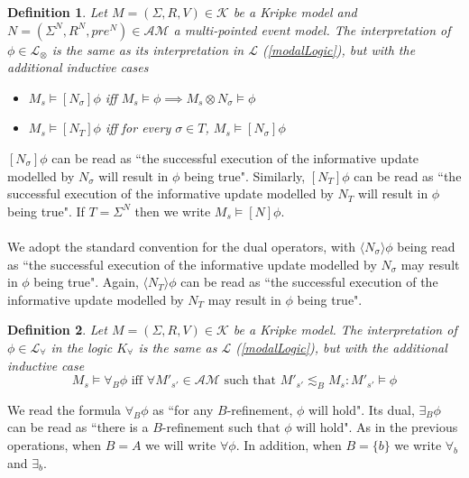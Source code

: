 \documentclass[12pt, a4paper, titlepage]{scrartcl}
\newtheorem{defn}{Definition}[section]
\numberwithin{equation}{section}
\newcommand{\lang}{\mathcal{L}}
\newcommand{\langRefine}{\lang_{\forall}}
\newcommand{\langActEx}{\lang_{\otimes}}
\newcommand{\kripkeClass}{\mathcal{K}}
\newcommand{\eventClass}{\mathcal{AM}}
\begin{document}
\begin{defn} \label{actModelLogic}
Let $M = (\Sigma, R, V) \in \kripkeClass$ be a Kripke model and $N = (\Sigma^N, R^N, pre^N) \in
\eventClass$ a multi-pointed event model.
The interpretation of $\phi \in \langActEx$ is the same as its interpretation in $\lang$
(\ref{modalLogic}), but with the additional
inductive cases
\begin{itemize}
	\item $M_s \models [ N_\sigma ] \phi$ iff $M_s \models \phi \implies M_s \otimes N_\sigma \models
	\phi$
	\item $M_s \models [ N_T ] \phi$ iff for every $\sigma \in T$, $M_s \models [ N_\sigma ] \phi$ 
\end{itemize}
\end{defn}
$[ N_\sigma ] \phi$ can be read as ``the successful execution of the informative update modelled by
$N_\sigma$ will result in $\phi$ being true".
Similarly, $[ N_T ] \phi$ can be read as ``the successful execution of the informative update
modelled by $N_T$ will result in $\phi$ being true".
If $T = \Sigma^N$ then we write $M_s \models [ N ] \phi$.\\
\\
We adopt the standard convention for the dual operators, with $\langle N_\sigma \rangle \phi$ being
read as ``the successful execution of the informative update modelled by $N_\sigma$ may result in
$\phi$ being true".
Again, $\langle N_T \rangle \phi$ can be read as ``the successful execution of the informative
update modelled by $N_T$ may result in $\phi$ being true".


\begin{defn} \label{refineLogic}
Let $M = (\Sigma, R, V) \in \kripkeClass$ be a Kripke model.
The interpretation of $\phi \in \langRefine$ in the logic $K_\forall$ is the same as $\lang$
(\ref{modalLogic}), but with the additional inductive case
\[
	M_s \models \forall_B \phi \text{ iff } \forall M'_{s'} \in \eventClass \text{ such that } M'_{s'}
	\lesssim_B M_s : M'_{s'} \models \phi
\]
\end{defn}
We read the formula $\forall_B \phi$ as ``for any $B$-refinement, $\phi$ will hold".
Its dual, $\exists_B \phi$ can be read as ``there is a $B$-refinement such that $\phi$ will hold".
As in the previous operations, when $B = A$ we will write $\forall \phi$.
In addition, when $B = \{b\}$ we write $\forall_b$ and $\exists_b$.

\end{document}

